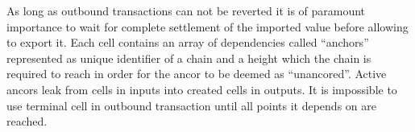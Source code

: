 As long as outbound transactions can not be reverted it is of paramount importance to wait for complete settlement of the imported value before allowing to export it.
Each cell contains an array of dependencies called \enquote{anchors} represented as unique identifier of a chain and a height which the chain is required to reach in order for the ancor to be deemed as \enquote{unancored}.
Active ancors leak from cells in inputs into created cells in outputs.
It is impossible to use terminal cell in outbound transaction until all points it depends on are reached.
